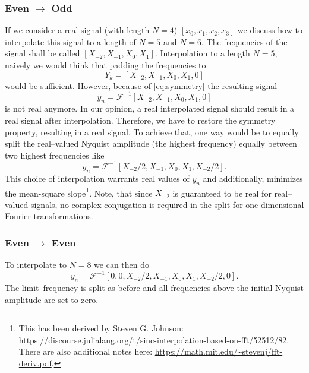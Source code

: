 \documentclass{juliacon}
\begin{document}
        \subsubsection{Even $\rightarrow$ Odd}
            If we consider a real signal (with length $N=4$) $[x_0, x_1, x_2, x_3]$ we discuss how to interpolate
            this signal to a length of $N=5$ and $N=6$.
            The frequencies of the signal shall be called $[X_{-2}, X_{-1}, X_0, X_1]$.
            Interpolation to a length $N=5$, naively we would think that padding the frequencies to
            \begin{equation}
                Y_k = [X_{-2}, X_{-1}, X_0, X_1, 0]
            \end{equation}
            would be sufficient. However, because of \autoref{eq:symmetry} the resulting signal
            \begin{equation}
                y_n = \mathcal{F}^{-1}\left[X_{-2}, X_{-1}, X_0, X_1, 0\right]
            \end{equation}
            is not real anymore. In our opinion, a real interpolated signal
            should result in a real signal after interpolation.
            Therefore, we have to restore the symmetry property, resulting in a real signal.
            To achieve that, one way would be to equally split the real--valued Nyquist amplitude (the highest frequency) equally between two highest frequencies like
            \begin{equation}
                y_n = \mathcal{F}^{-1}\left[X_{-2} / 2, X_{-1}, X_0, X_1, X_{-2}/2 \right].
            \end{equation}
            This choice of interpolation warrants real values of $y_n$ and additionally, minimizes the mean-square slope\footnote{This has been derived by Steven G. Johnson: \url{https://discourse.julialang.org/t/sinc-interpolation-based-on-fft/52512/82}.
            There are also additional notes here: \url{https://math.mit.edu/~stevenj/fft-deriv.pdf}.}. Note, that since $X_{-2}$ is guaranteed to be real for real--valued signals, no complex conjugation is required in the split for one-dimensional Fourier-transformations.
        
        \subsubsection{Even $\rightarrow$ Even}
            To interpolate to $N=8$ we can then do
            \begin{equation}
                y_n = \mathcal{F}^{-1}\left[0, 0, X_{-2} / 2, X_{-1}, X_0, X_1, X_{-2}/2, 0 \right].
            \end{equation}
            The limit--frequency is split as before and all frequencies above the initial Nyquist amplitude are set to zero.
            
\end{document}
